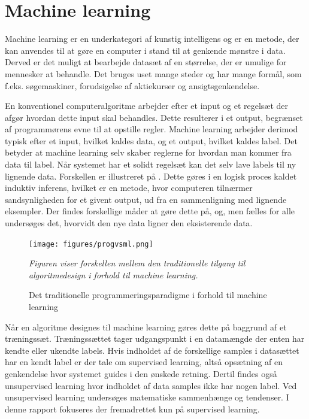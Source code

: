 \section{Machine learning}
Machine learning er en underkategori af kunstig intelligens og er en metode, der kan anvendes til at gøre en computer i stand til at genkende mønstre i data. Derved er det muligt at bearbejde datasæt af en størrelse, der er umulige for mennesker at behandle. Det bruges uset mange steder og har mange formål, som f.eks. søgemaskiner, forudsigelse af aktiekurser og ansigtsgenkendelse.\cite{DIKU2010} 

En konventionel computeralgoritme arbejder efter et input og et regelsæt der afgør hvordan dette input skal behandles. Dette resulterer i et output, begrænset af programmørens evne til at opstille regler. Machine learning arbejder derimod typisk efter et input, hvilket kaldes data, og et output, hvilket kaldes label. Det betyder at machine learning selv skaber reglerne for hvordan man kommer fra data til label. Når systemet har et solidt regelsæt kan det selv lave labels til ny lignende data. Forskellen er illustreret på . Dette gøres i en logisk proces kaldet induktiv inferens, hvilket er en metode, hvor computeren tilnærmer sandsynligheden for et givent output, ud fra en sammenligning med lignende eksempler. Der findes forskellige måder at gøre dette på, og, men fælles for alle undersøges det, hvorvidt den nye data ligner den eksisterende data.\cite{DIKU2010}

\begin{figure}[H]
	\centering
	\texttt{[image: figures/progvsml.png]}
	\flushleft 
	\caption{Det traditionelle programmeringsparadigme i forhold til machine learning}
	\label{progvsml}
	\flushleft
	\textit{Figuren viser forskellen mellem den traditionelle tilgang til algoritmedesign i forhold til machine learning.}
\end{figure}

Når en algoritme designes til machine learning gøres dette på baggrund af et træningssæt. \cite{DIKU2010} Træningssættet tager udgangspunkt i en datamængde der enten har kendte eller ukendte labels. Hvis indholdet af de forskellige samples i datasættet har en kendt label er der tale om supervised learning, altså opsætning af en genkendelse hvor systemet guides i den ønskede retning. \cite{Brownlee2013} Dertil findes også unsupervised learning hvor indholdet af data samples ikke har nogen label. Ved unsupervised learning undersøges matematiske sammenhænge og tendenser. \cite{Brownlee2013} I denne rapport fokuseres der fremadrettet kun på supervised learning.

